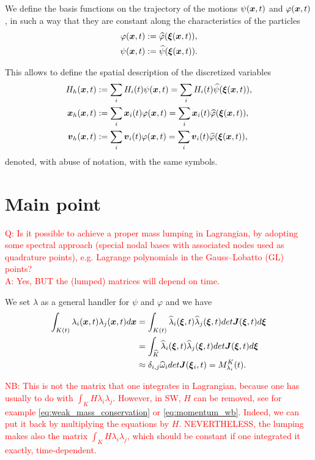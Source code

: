 \documentclass[english]{article}
\theoremstyle{thmstyleone}
\theoremstyle{thmstyletwo}
\theoremstyle{thmstylethree}
\newcommand{\uvec}[2][3]{\boldsymbol{#2\mkern-#1mu}\mkern#1mu}
\newcommand{\hpsi}{\widehat{\psi}}
\newcommand{\hphi}{\widehat{\varphi}}
\newcommand{\hl}{\widehat{\lambda}}
\begin{document}
We define the basis functions on the trajectory of the motions $\psi(\uvec{x},t)$ and $\varphi(\uvec{x},t)$, in such a way that they are constant along the characteristics of the particles
\begin{align}
\varphi(\uvec{x},t)&:=\hphi(\uvec{\xi}(\uvec{x},t)),\\
\psi(\uvec{x},t)&:=\hpsi(\uvec{\xi}(\uvec{x},t)).
\end{align}

This allows to define the spatial description of the discretized variables
\begin{align}
H_h(\uvec{x},t)&:=\sum_{i}H_i(t)\psi(\uvec{x},t)=\sum_{i}H_i(t)\hpsi(\uvec{\xi}(\uvec{x},t)),\\
\uvec{x}_h(\uvec{x},t)&:=\sum_{i}\uvec{x}_i(t)\varphi(\uvec{x},t)=\sum_{i}\uvec{x}_i(t)\hphi(\uvec{\xi}(\uvec{x},t)),\\
\uvec{v}_h(\uvec{x},t)&:=\sum_{i}\uvec{v}_i(t)\varphi(\uvec{x},t)=\sum_{i}\uvec{v}_i(t)\hphi(\uvec{\xi}(\uvec{x},t)),
\end{align}
denoted, with abuse of notation, with the same symbols.



\section{Main point}\label{sec:main_point}
\textcolor{red}{
Q: Is it possible to achieve a proper mass lumping in Lagrangian, by adopting some spectral approach (special nodal bases with associated nodes used as quadrature points), e.g. Lagrange polynomials in the Gauss--Lobatto (GL) points?\\
A: Yes, BUT the (lumped) matrices will depend on time.
}

We set $\lambda$ as a general handler for $\psi$ and $\varphi$ and we have
\begin{align}
\begin{split}
\int_{K(t)} \lambda_i(\uvec{x},t)\lambda_j(\uvec{x},t)d\uvec{x}&=\int_{K(t)} \hl_i(\uvec{\xi},t)\hl_j(\uvec{\xi},t) det \uvec{J}(\uvec{\xi},t) d\uvec{\xi}\\
&=\int_{\widehat{K}} \hl_i(\uvec{\xi},t)\hl_j(\uvec{\xi},t) det \uvec{J}(\uvec{\xi},t) d\uvec{\xi}\\
&\approx \delta_{i,j}\widehat{\omega}_i det \uvec{J}(\uvec{\xi}_i,t)=M_{\lambda_i}^K(t).
\end{split}
\end{align}

\textcolor{red}{
NB: This is not the matrix that one integrates in Lagrangian, because one has usually to do with $\int_K H\lambda_i\lambda_j$.
However, in SW, $H$ can be removed, see for example \eqref{eq:weak_mass_conservation} or \eqref{eq:momentum_wb}. Indeed, we can put it back by multiplying the equations by $H$.
NEVERTHELESS, the lumping makes also the matrix $\int_K H\lambda_i\lambda_j$, which should be constant if one integrated it exactly, time-dependent.}
\end{document}
